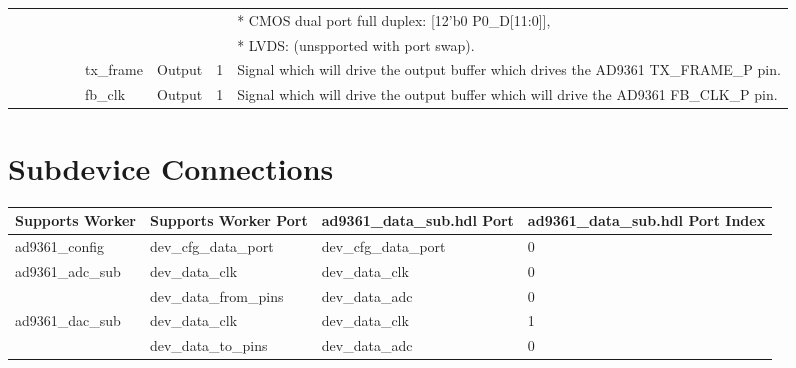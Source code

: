 \documentclass{article}
\def\comp{ad9361\_data\_sub}
\begin{document}
\begin{landscape}
\begin{scriptsize}
\begin{tabular}{|p{1.75cm}|p{2.25cm}|p{1cm}|p{1cm}|p{1.25cm}|p{3cm}|p{1.4cm}|p{0.9cm}|p{7cm}|}
			                           &                                 &       &          &                       &                       &                            &                          & * CMOS dual port full duplex: [12'b0 P0\_D[11:0]], \\
			                           &                                 &       &          &                       &                       &                            &                          & * LVDS: (unspported with port swap). \\
			\cline{6-9}
			&  &  &     &      &tx\_frame&Output&1& Signal which will drive the output buffer which drives the AD9361 TX\_FRAME\_P pin. \\
			\cline{6-9}
			&  &  &     &      &fb\_clk  &Output&1& Signal which will drive the output buffer which will drive the AD9361 FB\_CLK\_P pin. \\
			\hline
	    \end{tabular}
	\end{scriptsize}
	
	\section*{Subdevice Connections}
	\begin{scriptsize}
		\begin{tabular}{|p{5cm}|p{5cm}|p{5cm}|p{6.73cm}|}
			\hline
			\rowcolor{blue}
			Supports Worker & Supports Worker Port & \comp{}.hdl Port     & \comp{}.hdl Port Index \\
			\hline
			ad9361\_config  & dev\_cfg\_data\_port & dev\_cfg\_data\_port & 0                      \\
			\hline
			\multirow{2}{*}{ad9361\_adc\_sub}& dev\_data\_clk       & dev\_data\_clk       & 0                      \\
			\cline{2-4}
			                & dev\_data\_from\_pins& dev\_data\_adc       & 0                      \\
			\hline
			\multirow{2}{*}{ad9361\_dac\_sub}& dev\_data\_clk       & dev\_data\_clk       & 1                      \\
			\cline{2-4}
			                & dev\_data\_to\_pins  & dev\_data\_adc       & 0                      \\
			\hline
		\end{tabular}
	\end{scriptsize}

\end{landscape}
\end{document}
